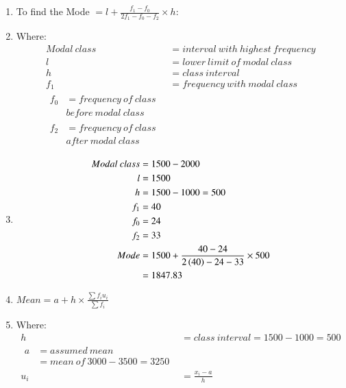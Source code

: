 \renewcommand{\theequation}{\theenumi}
\begin{enumerate}

\item To find the Mode $= l + \frac{f_1 - f_0}{2f_1 - f_0 - f_2} \times h$:

\item Where:
\begin{align*}
Modal\ class &= interval\ with\ highest\ frequency\\
l &= lower\ limit\ of\ modal\ class\\
h &= class\ interval\\
f_1 &= frequency\ with\ modal\ class\\
\begin{split}
f_0 &= frequency\ of\ class\ \\ &before\ modal\ class
\end{split}\\
\begin{split}
f_2 &= frequency\ of\ class\ \\ &after\ modal\ class
\end{split}
\end{align*}

\item
\begin{align}
Modal\ class &= 1500 - 2000\\ 
l &= 1500\\
h &= 1500-1000 = 500\\
f_1 &= 40\\
f_0 &= 24\\
f_2 &= 33\\
Mode &= 1500 + \frac{40-24}{2\left(40\right) - 24 - 33} \times 500\\
&= 1847.83
\end{align}

\item $Mean = a + h \times \frac{\sum f_i u_i}{\sum f_i}$

\item Where:
\begin{align*}
h &= class\ interval = 1500 - 1000 = 500 \\
\begin{split}
a &= assumed\ mean \\
&= mean\ of\ 3000-3500 = 3250
\end{split}\\
u_i &= \frac{x_i-a}{h}
\end{align*}


\end{enumerate}
